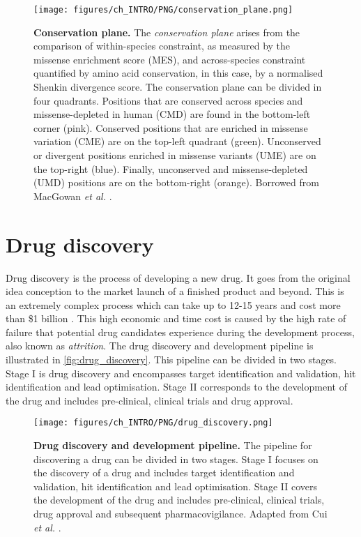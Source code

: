 \begin{figure}[htb!]
    \centering
    \texttt{[image: figures/ch\_INTRO/PNG/conservation\_plane.png]}
    \caption[Conservation plane]{\textbf{Conservation plane.} The \textit{conservation plane} arises from the comparison of within-species constraint, as measured by the missense enrichment score (MES), and across-species constraint quantified by amino acid conservation, in this case, by a normalised Shenkin divergence score. The conservation plane can be divided in four quadrants. Positions that are conserved across species and missense-depleted in human (CMD) are found in the bottom-left corner (pink). Conserved positions that are enriched in missense variation (CME) are on the top-left quadrant (green). Unconserved or divergent positions enriched in missense variants (UME) are on the top-right (blue). Finally, unconserved and missense-depleted (UMD) positions are on the bottom-right (orange). Borrowed from MacGowan \textit{et al.} \cite{MACGOWAN_2024_VARIANTS}.}
    \label{fig:conservation_plane}
\end{figure}

\vspace{-13pt} %
\vspace{-13pt} %

\section{Drug discovery}

Drug discovery is the process of developing a new drug. It goes from the original idea conception to the market launch of a finished product and beyond. This is an extremely complex process which can take up to 12-15 years and cost more than \$1 billion \cite{HUGHES_2011_DRUGS}. This high economic and time cost is caused by the high rate of failure that potential drug candidates experience during the development process, also known as \textit{attrition}. The drug discovery and development pipeline is illustrated in \autoref{fig:drug_discovery}. This pipeline can be divided in two stages. Stage I is drug discovery and encompasses target identification and validation, hit identification and lead optimisation. Stage II corresponds to the development of the drug and includes pre-clinical, clinical trials and drug approval.

\begin{figure}[htb!]
    \centering
    \texttt{[image: figures/ch\_INTRO/PNG/drug\_discovery.png]}
    \caption[Drug discovery and development pipeline]{\textbf{Drug discovery and development pipeline.}  The pipeline for discovering a drug can be divided in two stages. Stage I focuses on the discovery of a drug and includes target identification and validation, hit identification and lead optimisation. Stage II covers the development of the drug and includes pre-clinical, clinical trials, drug approval and subsequent pharmacovigilance. Adapted from Cui \textit{et al.} \cite{CUI_2020_DRUGS}.}
    \label{fig:drug_discovery}
\end{figure}

